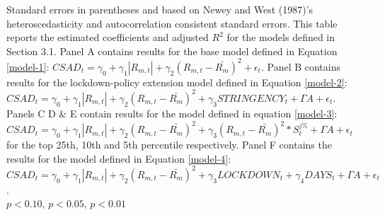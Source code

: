 \begin{table}[htbp]
\begin{threeparttable}
\begin{tabular}{l*{6}{c}}
\bottomrule
\end{tabular}
\begin{tablenotes}
\footnotesize Standard errors in parentheses and based on Newey and West (1987)'s heteroscedasticity and autocorrelation consistent standard errors. This table reports the estimated coefficients and adjusted $R^2$ for the models defined in Section 3.1. Panel A contains results for the base model defined in Equation \ref{model-1}: $CSAD_t=\gamma_0+\gamma_1 |R_{m,t}|+\gamma_2 (R_{m,t}-\bar{R_m})^2+\epsilon_t$. Panel B contains results for the lockdown-policy extension model defined in Equation \ref{model-2}: $CSAD_t=\gamma_0+\gamma_1 |R_{m,t}|+\gamma_2(R_{m,t}-\bar{R_m})^2+\gamma_3STRINGENCY_t+\Gamma{A}+\epsilon_t$. Panels C D \& E contain results for the model defined in equation \ref{model-3}: $CSAD_t=\gamma_0+\gamma_1 |R_{m,t}|+\gamma_2 (R_{m,t}-\bar{R_m})^2+\gamma_3(R_{m,t}-\bar{R_m})^2*S_t^{j\%}+\Gamma{A}+\epsilon_t$ for the top 25th, 10th and 5th percentile respectively. Panel F contains the results for the model defined in Equation \ref{model-4}: $CSAD_t=\gamma_0+\gamma_1 |R_{m,t}|+\gamma_2 (R_{m,t}-\bar{R_m})^2+\gamma_3LOCKDOWN_t+\gamma_4DAYS_t+\Gamma{A}+\epsilon_t$.\\
\sym{*} \(p<0.10\), \sym{**} \(p<0.05\), \sym{***} \(p<0.01\)\\
\end{tablenotes}
\end{threeparttable}
\end{table}
